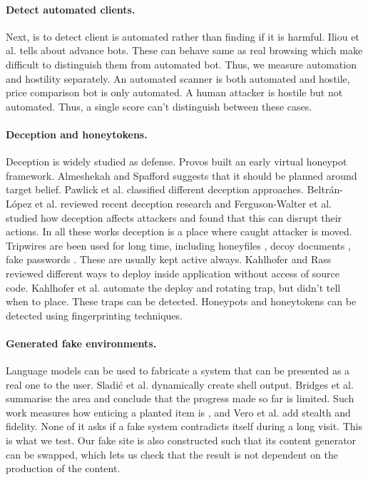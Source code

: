 \documentclass[runningheads]{llncs}
\begin{document}
\paragraph{Detect automated clients.}  Next, is to detect client is automated rather than finding if it is harmful. Iliou et al. \cite{iliou2021detection} tells about advance bots. These can behave same as real browsing which make difficult to distinguish them from automated bot. Thus, we measure automation and hostility separately. An automated scanner is both automated and hostile, price comparison bot is only automated. A human attacker is hostile but not automated. Thus, a single score can't distinguish between these cases.

\paragraph{Deception and honeytokens.} Deception is widely studied as defense. Provos \cite{provos2004honeyd} built an early virtual honeypot framework. Almeshekah and Spafford \cite{almeshekah2014planning} suggests that it should be planned around target belief. Pawlick et al. \cite{pawlick2019taxonomy} classified different deception approaches. Beltr\'an-L\'opez et al. \cite{beltran2025cyberdeception} reviewed recent deception research and Ferguson-Walter et al. \cite{fergusonwalter2021examining} studied how deception affects attackers and found that this can disrupt their actions. In all these works deception is a place where caught attacker is moved. Tripwires are been used for long time, including honeyfiles \cite{yuill2004honeyfiles}, decoy documents \cite{bowen2009baiting}, fake passwords \cite{juels2013honeywords}. These are usually kept active always. Kahlhofer and Rass \cite{kahlhofer2024applayer} reviewed different ways to deploy inside application without access of source code. Kahlhofer et al. \cite{kahlhofer2025koney} automate the deploy and rotating trap, but didn't tell when to place. These traps can be detected. Honeypots \cite{vetterl2018bitter} and honeytokens \cite{srinivasa2020honeytoken} can be detected using fingerprinting techniques.


\paragraph{Generated fake environments.} Language models can be used to fabricate a system that can be presented as a real one to the user. Sladi\'c et al. \cite{sladic2024shellm} dynamically create shell output. Bridges et al. \cite{bridges2025sok} summarise the area and conclude that the progress made so far is limited. Such work measures how enticing a planted item is \cite{kahlhofer2024honeyquest}, and Vero et al. \cite{vero2026honeyval} add stealth and fidelity. None of it asks if a fake system contradicts itself during a long visit. This is what we test. Our fake site is also constructed such that its content generator can be swapped, which lets us check that the result is not dependent on the production of the content.
\end{document}
